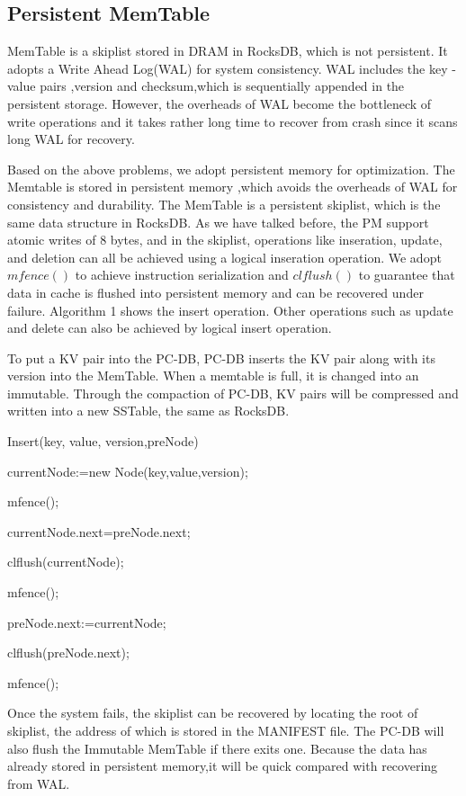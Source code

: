 \subsection{Persistent MemTable}
MemTable is a skiplist stored in DRAM in RocksDB, which is not persistent. 
It adopts a Write Ahead Log(WAL) for system consistency.
WAL includes the key -value pairs ,version and checksum,which is sequentially appended in the persistent storage. 
However, the overheads of WAL become the bottleneck of write operations and it takes rather long time to recover from crash since it scans long WAL for recovery.

Based on the above problems, we adopt persistent memory for optimization. 
The Memtable is stored in persistent memory ,which avoids the overheads of WAL for consistency and durability. 
The MemTable is a persistent skiplist, which is the same data structure in  RocksDB. As we have talked before, the PM support atomic writes of 8 bytes, 
and in the skiplist, operations like inseration, update, and deletion can all be achieved using a logical inseration operation.
We adopt  $mfence()$ to achieve instruction serialization and $clflush()$ to guarantee that data in cache is flushed into persistent memory and can be recovered under failure. 
Algorithm 1 shows the insert operation. Other operations such as update and delete can also be achieved by logical insert operation.

To put a KV pair into the PC-DB, PC-DB inserts the KV pair along with its version into the MemTable. 
When a memtable is full, it is changed into an immutable. 
Through the compaction of PC-DB, KV pairs will be compressed and written into a new SSTable, the same as RocksDB.


\begin{algorithm}[t]
\caption{Insert(key, value, version,preNode)} %


currentNode:=new Node(key,value,version);

mfence();

currentNode.next=preNode.next;

clflush(currentNode);

mfence();

preNode.next:=currentNode;

clflush(preNode.next);

mfence();

\end{algorithm}

Once the system fails, 
the skiplist can be recovered  by locating the root of skiplist, 
the address of which is stored in the MANIFEST file. The PC-DB will also flush the Immutable MemTable if there exits one.
Because the data has already stored in persistent memory,it will be quick compared with recovering from WAL.


